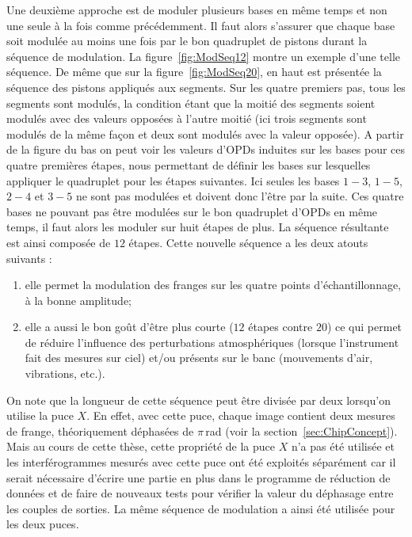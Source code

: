 Une deuxième approche est de moduler plusieurs bases en même temps et non une seule à la fois comme précédemment. Il faut alors s'assurer que chaque base soit modulée au moins une fois par le bon quadruplet de pistons durant la séquence de modulation. La figure~\ref{fig:ModSeq12} montre un exemple d'une telle séquence. De même que sur la figure~\ref{fig:ModSeq20}, en haut est présentée la séquence des pistons appliqués aux segments. Sur les quatre premiers pas, tous les segments sont modulés, la condition étant que la moitié des segments soient modulés avec des valeurs opposées à l'autre moitié (ici trois segments sont modulés de la même façon et deux sont modulés avec la valeur opposée). A partir de la figure du bas on peut voir les valeurs d'\ac{OPD}s induites sur les bases pour ces quatre premières étapes, nous permettant de définir les bases sur lesquelles appliquer le quadruplet pour les étapes suivantes. Ici seules les bases $1-3$, $1-5$, $2-4$ et $3-5$ ne sont pas modulées et doivent donc l'être par la suite. Ces quatre bases ne pouvant pas être modulées sur le bon quadruplet d'\ac{OPD}s en même temps, il faut alors les moduler sur huit étapes de plus. La séquence résultante est ainsi composée de $12$ étapes. Cette nouvelle séquence a les deux atouts suivants :

\begin{enumerate}
    \item elle permet la modulation des franges sur les quatre points d'échantillonnage, à la bonne amplitude;
    \item elle a aussi le bon goût d'être plus courte ($12$ étapes contre $20$) ce qui permet de réduire l'influence des perturbations atmosphériques (lorsque l'instrument fait des mesures sur ciel) et/ou présents sur le banc (mouvements d'air, vibrations, etc.).
\end{enumerate}

On note que la longueur de cette séquence peut être divisée par deux lorsqu'on utilise la puce $X$. En effet, avec cette puce, chaque image contient deux mesures de frange, théoriquement déphasées de $\pi \,$rad (voir la section~\ref{sec:ChipConcept}). Mais au cours de cette thèse, cette propriété de la puce $X$ n'a pas été utilisée et les interférogrammes mesurés avec cette puce ont été exploités séparément car il serait nécessaire d'écrire une partie en plus dans le programme de réduction de données et de faire de nouveaux tests pour vérifier la valeur du déphasage entre les couples de sorties. La même séquence de modulation a ainsi été utilisée pour les deux puces.

